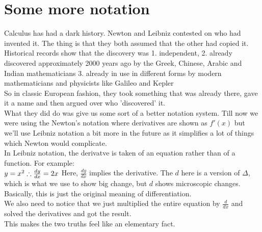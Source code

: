 \section{Some more notation}
Calculus has had a dark history. Newton and Leibniz contested on who had invented it. The thing is that they both assumed that the other had copied it. Historical records show that the discovery was 1. independent, 2. already discovered approximately 2000 years ago by the Greek, Chinese, Arabic and Indian mathematicians 3. already in use in different forms by modern mathematicians and physicists like Galileo and Kepler\\
So in classic European fashion, they took something that was already there, gave it a name and then argued over who 'discovered' it.\\
What they did do was give us some sort of a better notation system. Till now we were using the Newton's notation where derivatives are shown as $f'(x)$ but we'll use Leibniz notation a bit more in the future as it simplifies a lot of things which Newton would complicate.\\
In Leibniz notation, the derivatve is taken of an equation rather than of a function. For example:\\
$y=x^2\\
\therefore \frac{dy}{dx}=2x$
Here, $\frac{dy}{dx}$ implies the derivative. The $d$ here is a version of $\Delta$, which is what we use to show big change, but $d$ shows microscopic changes. Basically, this is just the original meaning of differentiation.\\
We also need to notice that we just multiplied the entire equation by $\frac{d}{dx}$ and solved the derivatives and got the result.\\
This makes the two truths feel like an elementary fact.\\
